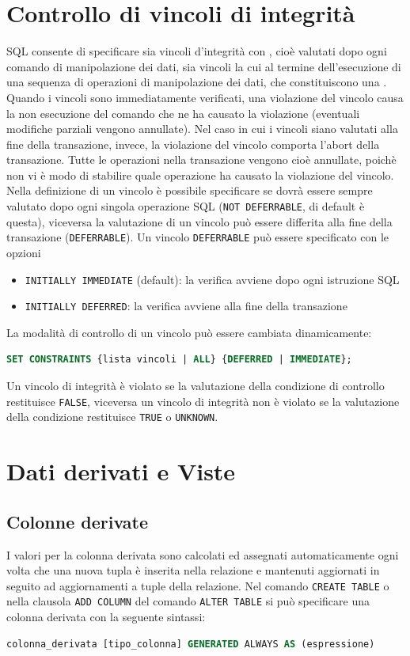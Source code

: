 \documentclass[12pt, a4paper]{report}
\begin{document}
    \section{Controllo di vincoli di integrità}
    SQL consente di specificare sia vincoli d'integrità con , cioè valutati dopo ogni comando di manipolazione dei dati, sia vincoli la cui  al termine dell'esecuzione di una sequenza di operazioni di manipolazione dei dati, che constituiscono una . Quando i vincoli sono immediatamente verificati, una violazione del vincolo causa la non esecuzione del comando che ne ha causato la violazione (eventuali modifiche parziali vengono annullate). Nel caso in cui i vincoli siano valutati alla fine della transazione, invece, la violazione del vincolo comporta l'abort della transazione. Tutte le operazioni nella transazione vengono cioè annullate, poichè non vi è modo di stabilire quale operazione ha causato la violazione del vincolo.\\
    Nella definizione di un vincolo è possibile specificare se dovrà essere sempre valutato dopo ogni singola operazione SQL (\texttt{NOT DEFERRABLE}, di default è questa), viceversa  la valutazione di un vincolo può essere differita alla fine della transazione (\texttt{DEFERRABLE}). Un vincolo \texttt{DEFERRABLE} può essere specificato con le opzioni
    \begin{itemize}
        \item \texttt{INITIALLY IMMEDIATE} (default): la verifica avviene dopo ogni istruzione SQL 
        \item \texttt{INITIALLY DEFERRED}: la verifica avviene alla fine della transazione
    \end{itemize}
    La modalità di controllo di un vincolo può essere cambiata dinamicamente:
    \begin{lstlisting}[language=SQL]
        SET CONSTRAINTS {lista vincoli | ALL} {DEFERRED | IMMEDIATE};
    \end{lstlisting} 
    Un vincolo di integrità è violato se la valutazione della condizione di controllo restituisce \texttt{FALSE}, viceversa un vincolo di integrità non è violato se la valutazione della condizione restituisce \texttt{TRUE} o \texttt{UNKNOWN}.
    \section{Dati derivati e Viste}
    \subsection{Colonne derivate}
    I valori per la colonna derivata sono calcolati ed assegnati automaticamente ogni volta che una nuova tupla è inserita nella relazione e mantenuti aggiornati in seguito ad aggiornamenti a tuple della relazione. Nel comando \texttt{CREATE TABLE} o nella clausola \texttt{ADD COLUMN} del comando \texttt{ALTER TABLE} si può specificare una colonna derivata con la seguente sintassi:
    \begin{lstlisting}[language=SQL]
        colonna_derivata [tipo_colonna] GENERATED ALWAYS AS (espressione)
    \end{lstlisting}
\end{document}
